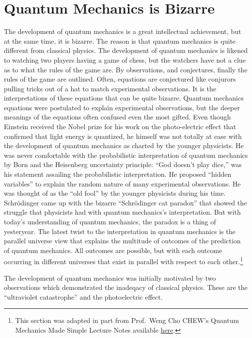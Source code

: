 \documentclass[
  9pt,
]{extbook}
\theoremstyle{definition}
\theoremstyle{definition}
\theoremstyle{definition}
\theoremstyle{remark}
\begin{document}
\hypertarget{quantum-mechanics-is-bizarre}{%
\section{Quantum Mechanics is Bizarre}\label{quantum-mechanics-is-bizarre}}

The development of quantum mechanics is a great intellectual achievement, but at the same time, it is bizarre. The reason is that quantum mechanics is quite different from classical physics. The development of quantum mechanics is likened to watching two players having a game of chess, but the watchers have not a clue as to what the rules of the game are. By observations, and conjectures, finally the rules of the game are outlined. Often, equations are conjectured like conjurors pulling tricks out of a hat to match experimental observations. It is the interpretations of these equations that can be quite bizarre.
Quantum mechanics equations were postulated to explain experimental observations, but the deeper meanings of the equations often confused even the most gifted. Even though Einstein received the Nobel prize for his work on the photo-electric effect that confirmed that light energy is quantized, he himself was not totally at ease with the development of quantum mechanics as charted by the younger physicists. He was never comfortable with the probabilistic interpretation of quantum mechanics by Born and the Heisenberg uncertainty principle: ``God doesn't play dice,'' was his statement assailing the probabilistic interpretation. He proposed ``hidden variables'' to explain the random nature of many experimental observations. He was thought of as the ``old fool'' by the younger physicists during his time.
Schrödinger came up with the bizarre ``Schrödinger cat paradox'' that showed the struggle that physicists had with quantum mechanics's interpretation. But with today's understanding of quantum mechanics, the paradox is a thing of yesteryear.
The latest twist to the interpretation in quantum mechanics is the parallel universe view that explains the multitude of outcomes of the prediction of quantum mechanics. All outcomes are possible, but with each outcome occurring in different universes that exist in parallel with respect to each other.\footnote{This section was adapted in part from Prof.~Weng Cho CHEW's Quantum Mechanics Made Simple Lecture Notes available \href{http://wcchew.ece.illinois.edu/chew/course/qmall20121005.pdf}{here}.}

The development of quantum mechanics was initially motivated by two observations which demonstrated the inadeqacy of classical physics. These are the ``ultraviolet catastrophe'' and the photoelectric effect.
\end{document}
